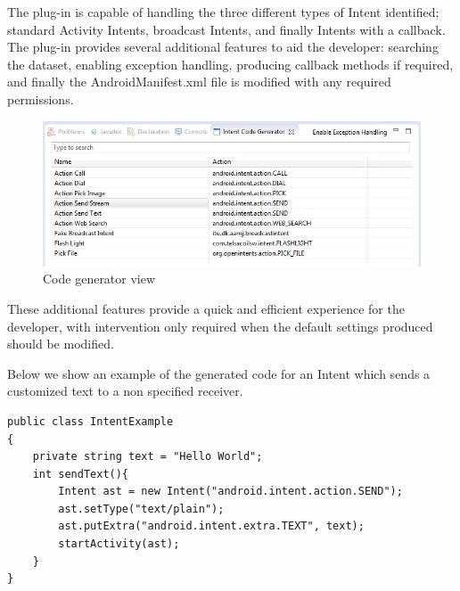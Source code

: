  
The plug-in is capable of handling the three different types of Intent identified; standard Activity Intents, broadcast Intents, and finally Intents with a callback. The plug-in provides several additional features to aid the developer: searching the dataset, enabling exception handling, producing callback methods if required, and finally the AndroidManifest.xml file is modified with any required permissions.


\begin{figure}[t]
\label{codegeneratorview}
  \centering
    \includegraphics[width=\textwidth]{codegenerator}
  \caption{Code generator view}
\end{figure}

These additional features provide a quick and efficient experience for the developer, with intervention only required when the default settings produced should be modified.

Below we show an example of the generated code for an Intent which sends a customized text to a non specified receiver.

{\footnotesize\begin{lstlisting}
public class IntentExample
{
	private string text = "Hello World";
	int sendText(){
		Intent ast = new Intent("android.intent.action.SEND");
		ast.setType("text/plain");
		ast.putExtra("android.intent.extra.TEXT", text);
		startActivity(ast);		
	}
}
\end{lstlisting}}